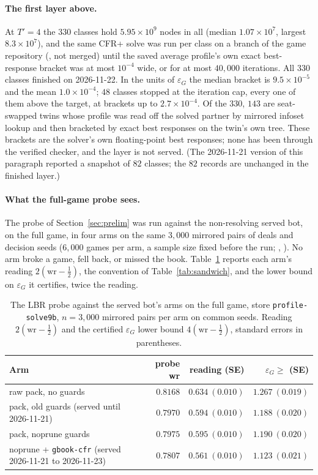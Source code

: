 \documentclass[11pt]{article}
\theoremstyle{plain}
\theoremstyle{definition}
\theoremstyle{remark}
\newcommand{\code}[1]{\texttt{\small #1}}
\newcommand{\game}{\ensuremath{G}}
\newcommand{\epsG}{\ensuremath{\varepsilon_{\game}}}
\begin{document}
\paragraph{The first layer above.} At $T'=4$ the $330$ classes hold
$5.95\times10^{9}$ nodes in all (median $1.07\times10^{7}$, largest
$8.3\times10^{7}$), and the same CFR+ solve was run per class on a
branch of the game repository (, not merged) until
the saved average profile's own exact best-response bracket was at most
$10^{-4}$ wide, or for at most $40{,}000$ iterations. All $330$ classes
finished on 2026-11-22. In the units of $\epsG$ the median bracket is
$9.5\times10^{-5}$ and the mean $1.0\times10^{-4}$; $48$ classes
stopped at the iteration cap, every one of them above the target, at
brackets up to $2.7\times10^{-4}$. Of the $330$, $143$ are seat-swapped
twins whose profile was read off the solved partner by mirrored infoset
lookup and then bracketed by exact best responses on the twin's own
tree. These brackets are the solver's own floating-point best
responses; none has been through the verified checker, and the layer is
not served. (The 2026-11-21 version of this paragraph reported a
snapshot of $82$ classes; the $82$ records are unchanged in the
finished layer.)

\paragraph{What the full-game probe sees.} The probe of
Section~\ref{sec:prelim} was run against the non-resolving served bot,
on the full game, in four arms on the same $3{,}000$ mirrored pairs of
deals and decision seeds ($6{,}000$ games per arm, a sample size fixed
before the run; ,
). No arm broke a game, fell back, or
missed the book. Table~\ref{tab:probeserved} reports each arm's reading
$2(\mathrm{wr}-\tfrac12)$, the convention of
Table~\ref{tab:sandwich}, and the lower bound on $\epsG$ it certifies,
twice the reading.

\begin{table}[t]
\centering
\caption{The LBR probe against the served bot's arms on the full game,
store \code{profile-solve9b}, $n=3{,}000$ mirrored pairs per arm on
common seeds. Reading $2(\mathrm{wr}-\tfrac12)$ and the certified
$\epsG$ lower bound $4(\mathrm{wr}-\tfrac12)$, standard errors in
parentheses.}
\label{tab:probeserved}
\small
\begin{tabular}{@{}lrrr@{}}
\toprule
Arm & probe wr & reading (SE) & $\epsG\ge$ (SE)\\
\midrule
raw pack, no guards & $0.8168$ & $0.634\ (0.010)$ & $1.267\ (0.019)$\\
pack, old guards (served until 2026-11-21) & $0.7970$ & $0.594\ (0.010)$ & $1.188\ (0.020)$\\
pack, noprune guards & $0.7975$ & $0.595\ (0.010)$ & $1.190\ (0.020)$\\
noprune + \code{gbook-cfr} (served 2026-11-21 to 2026-11-23) & $0.7807$ & $0.561\ (0.010)$ & $1.123\ (0.021)$\\
\bottomrule
\end{tabular}
\end{table}
\end{document}
